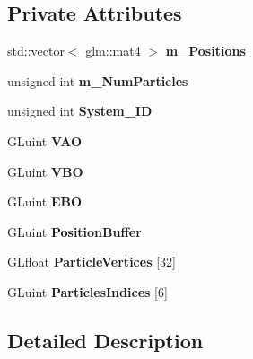 \subsection*{Private Attributes}
\begin{DoxyCompactItemize}
\item 
std\+::vector$<$ glm\+::mat4 $>$ {\bfseries m\+\_\+\+Positions}\hypertarget{class_particle_renderer_aaea7bcaea526e25b776bef6892de8c38}{}\label{class_particle_renderer_aaea7bcaea526e25b776bef6892de8c38}

\item 
unsigned int {\bfseries m\+\_\+\+Num\+Particles}\hypertarget{class_particle_renderer_aefa8d6a45e1e9074ed8bc2b864c8888a}{}\label{class_particle_renderer_aefa8d6a45e1e9074ed8bc2b864c8888a}

\item 
unsigned int {\bfseries System\+\_\+\+ID}\hypertarget{class_particle_renderer_ad222af206b523f93ee19a06e3e2770a2}{}\label{class_particle_renderer_ad222af206b523f93ee19a06e3e2770a2}

\item 
G\+Luint {\bfseries V\+AO}\hypertarget{class_particle_renderer_aabebb5220f544c3f38d0d95b8c32b66d}{}\label{class_particle_renderer_aabebb5220f544c3f38d0d95b8c32b66d}

\item 
G\+Luint {\bfseries V\+BO}\hypertarget{class_particle_renderer_a138f39ad4fb007a02effce41795057c9}{}\label{class_particle_renderer_a138f39ad4fb007a02effce41795057c9}

\item 
G\+Luint {\bfseries E\+BO}\hypertarget{class_particle_renderer_a85a2d6b6e5ed1e3a729e269c4afdb27f}{}\label{class_particle_renderer_a85a2d6b6e5ed1e3a729e269c4afdb27f}

\item 
G\+Luint {\bfseries Position\+Buffer}\hypertarget{class_particle_renderer_a3ecf4d143a72735431ccb807f7f180f6}{}\label{class_particle_renderer_a3ecf4d143a72735431ccb807f7f180f6}

\item 
G\+Lfloat {\bfseries Particle\+Vertices} \mbox{[}32\mbox{]}
\item 
G\+Luint {\bfseries Particles\+Indices} \mbox{[}6\mbox{]}
\end{DoxyCompactItemize}


\subsection{Detailed Description}


